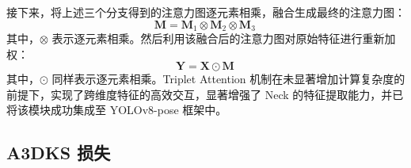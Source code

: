 接下来，将上述三个分支得到的注意力图逐元素相乘，融合生成最终的注意力图：
\begin{equation} 
	\mathbf{M} = \mathbf{M}_{1} \otimes \mathbf{M}_{2} \otimes \mathbf{M}_{3}\,
\end{equation}
其中，$\otimes$ 表示逐元素相乘。然后利用该融合后的注意力图对原始特征进行重新加权：
\begin{equation} 
	\mathbf{Y} = \mathbf{X} \odot \mathbf{M}\,
\end{equation}
其中，$\odot$ 同样表示逐元素相乘。Triplet Attention 机制在未显著增加计算复杂度的前提下，实现了跨维度特征的高效交互，显著增强了 Neck 的特征提取能力，并已将该模块成功集成至 YOLOv8-pose 框架中。



\subsection{A3DKS 损失}


